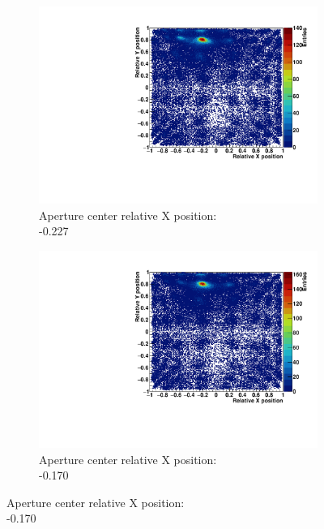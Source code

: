\begin{figure}
\centering
\begin{subfigure}[t]{0.32\textwidth}
\centering
\includegraphics[width=\textwidth]{03_GraphicFiles/chapter3_CLaRySproto/Absorber/images_scan/point_1mm/run00263_floodMap.pdf}
\caption{Aperture center relative X position: \\ -0.227}
\label{chap3::fig::scan_map1_1mm_point}
\end{subfigure}
\begin{subfigure}[t]{0.32\textwidth}
\centering
\includegraphics[width=\textwidth]{03_GraphicFiles/chapter3_CLaRySproto/Absorber/images_scan/point_1mm/run00264_floodMap.pdf}
\caption{Aperture center relative X position: \\ -0.170}
\label{chap3::fig::scan_map2_1mm_point}
\end{subfigure}

\end{figure}
